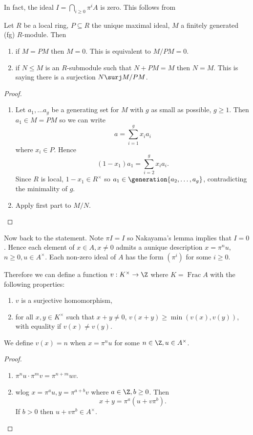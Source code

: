 \documentclass[a4paper]{article}
\DeclareMathOperator{\Frac}{Frac}
\begin{document}
In fact, the ideal \(I = \bigcap_{i \geq 0} \pi^i A\) is zero. This follows from
\begin{lemma}
  Let \(R\) be a local ring, \(P \subseteq R\) the unique maximal ideal, \(M\) a finitely generated (fg) \(R\)-module. Then
  \begin{enumerate}
  \item if \(M = P M\) then \(M = 0\). This is equivalent to \(M/PM = 0\).
  \item if \(N \leq M\) is an \(R\)-submodule such that \(N + PM = M\) then \(N = M\). This is saying there is a surjection \(N \surj M/PM\).
  \end{enumerate}
\end{lemma}

\begin{proof}\leavevmode
  \begin{enumerate}
  \item Let \(a_1, \dots a_g\) be a generating set for \(M\) with \(g\) as small as possible, \(g \geq 1\). Then \(a_1 \in M = PM\) so we can write
    \[
      a = \sum_{i = 1}^g x_i a_i
    \]
    where \(x_i \in P\). Hence
    \[
      (1 - x_1) a_1 = \sum_{i = 2}^g x_i a_i.
    \]
    Since \(R\) is local, \(1 - x_1 \in R^\times\) so \(a_1 \in \generation{a_2, \dots, a_g}\), contradicting the minimality of \(g\).
  \item Apply first part to \(M/N\).
  \end{enumerate}
\end{proof}

Now back to the statement. Note \(\pi I = I\) so Nakayama's lemma implies that \(I = 0\). Hence each element of \(x \in A, x \neq 0\) admits a aunique description \(x = \pi^n u\), \(n \geq 0, u \in A^\times\). Each non-zero ideal of \(A\) has the form \((\pi^i)\) for some \(i \geq 0\).

Therefore we can define a function \(v: K^\times \to \Z\) where \(K = \Frac A\) with the following properties:
\begin{enumerate}
\item \(v\) is a surjective homomorphism,
\item for all \(x, y \in K^\times\) such that \(x + y \neq 0\), \(v(x + y) \geq \min(v(x), v(y))\), with equality if \(v(x) \neq v(y)\).
\end{enumerate}
We define \(v(x) = n\) when \(x = \pi^n u\) for some \(n \in \Z, u \in A^\times\).

\begin{proof}\leavevmode
  \begin{enumerate}
  \item \(\pi^n u \cdot \pi^m v = \pi^{n + m} uv\).
  \item wlog \(x = \pi^a u, y = \pi^{a + b} v\) where \(a \in \Z, b \geq 0\). Then
    \[
      x + y = \pi^a(u + v \pi^ b).
    \]
    If \(b > 0\) then \(u + v \pi^b \in A^\times\).
  \end{enumerate}
\end{proof}
\end{document}
